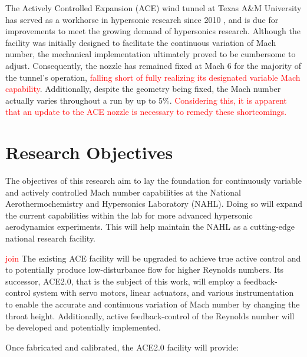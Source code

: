 The Actively Controlled Expansion (ACE) wind tunnel at Texas A\&M University has served as a workhorse in hypersonic research since 2010 \cite{ace09,ace10-calibrate,tichenor-dis,aceturb,mai-dis,neel-dis,leidy-dis}, and is due for improvements to meet the growing demand of hypersonics research. Although the facility was initially designed to facilitate the continuous variation of Mach number, the mechanical implementation ultimately proved to be cumbersome to adjust. Consequently, the nozzle has remained fixed at Mach 6 for the majority of the tunnel's operation, \textcolor{red}{falling short of fully realizing its designated variable Mach capability}. Additionally, despite the geometry being fixed, the Mach number actually varies throughout a run by up to 5\%. \textcolor{red}{Considering this, it is apparent that an update to the ACE nozzle is necessary to remedy these shortcomings.}

\section{Research Objectives}

The objectives of this research aim to lay the foundation for continuously variable and actively controlled Mach number capabilities at the National Aerothermochemistry and Hypersonics Laboratory (NAHL). Doing so will expand the current capabilities within the lab for more advanced hypersonic aerodynamics experiments. This will help maintain the NAHL as a cutting-edge national research facility.

\textcolor{red}{join} The existing ACE facility will be upgraded to achieve true active control and to potentially produce low-disturbance flow for higher Reynolds numbers. Its successor, ACE2.0, that is the subject of this work, will employ a feedback-control system with servo motors, linear actuators, and various instrumentation to enable the accurate and continuous variation of Mach number by changing the throat height. Additionally, active feedback-control of the Reynolds number will be developed and potentially implemented. 

Once fabricated and calibrated, the ACE2.0 facility will provide:

